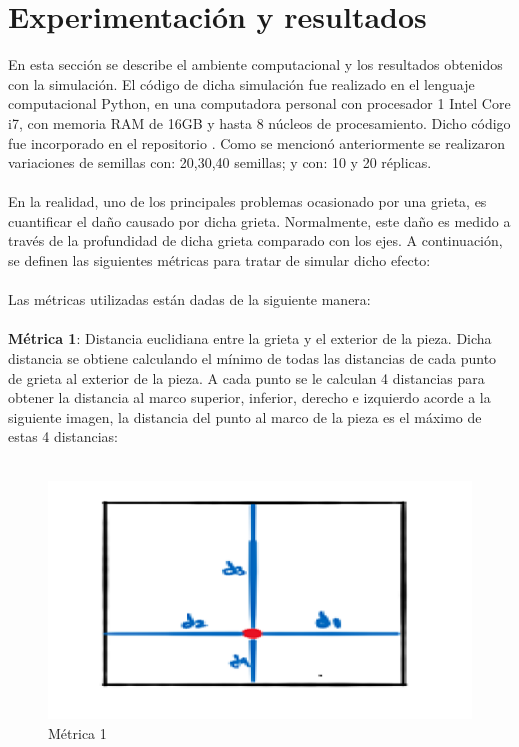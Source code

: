 \documentclass{article}
\begin{document}
\section{Experimentación y resultados}
En esta sección se describe el ambiente computacional y los resultados obtenidos con la simulación. El código de dicha simulación fue realizado en el lenguaje computacional Python, en una computadora personal con procesador 1 Intel Core i7, con memoria RAM de 16GB y hasta 8 núcleos de procesamiento. Dicho código fue incorporado en el repositorio \cite{p_4}. 
Como se mencionó anteriormente se realizaron variaciones de semillas con:  20,30,40 semillas; y con: 10 y 20 réplicas.\\
\\
En la realidad, uno de los principales problemas ocasionado por una grieta, es cuantificar el daño causado por dicha grieta. Normalmente, este daño es medido a través de la profundidad de dicha grieta comparado con los ejes. A continuación, se definen las siguientes métricas para tratar de simular dicho efecto:\\
\\
Las métricas utilizadas están dadas de la siguiente manera:\\
\\
\textbf{Métrica 1}: Distancia euclidiana entre la grieta y el exterior de la pieza. Dicha distancia se obtiene calculando el mínimo de todas las distancias de cada punto de grieta al exterior de la pieza. A cada punto se le calculan 4 distancias para obtener la distancia al marco superior, inferior, derecho e izquierdo acorde a la siguiente imagen, la distancia del punto al marco de la pieza es el máximo de estas 4 distancias:\\
\\
\begin{figure}[h]
	\centering
	\includegraphics[width=0.7\linewidth]{imagen1}
	\caption{Métrica 1}
	\label{fig:imagen1}
\end{figure}
\\
\end{document}
